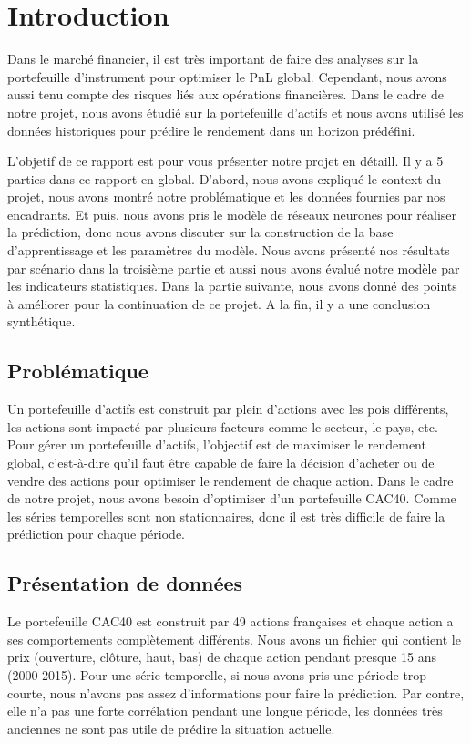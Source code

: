 
\section{Introduction}

Dans le marché financier, il est très important de faire des analyses sur la portefeuille d'instrument pour optimiser le PnL global. Cependant, nous avons aussi tenu compte des risques liés aux opérations financières. Dans le cadre de notre projet, nous avons étudié sur la portefeuille d'actifs et nous avons utilisé les données historiques pour prédire le rendement dans un horizon prédéfini.

L’objetif de ce rapport est pour vous présenter notre projet en détaill. Il y a 5 parties dans ce rapport en global. D’abord, nous avons expliqué le context du projet, nous avons montré notre problématique et les données fournies par nos encadrants. Et puis, nous avons pris le modèle de réseaux neurones pour réaliser la prédiction, donc nous avons discuter sur la construction de la base d’apprentissage et les paramètres du modèle. Nous avons présenté nos résultats par scénario dans la troisième partie et aussi nous avons évalué notre modèle par les indicateurs statistiques. Dans la partie suivante, nous avons donné des points à améliorer pour la continuation de ce projet. A la fin, il y a une conclusion synthétique. 


\subsection{Problématique}

Un portefeuille d'actifs est construit par plein d'actions avec les pois différents, les actions sont impacté par plusieurs facteurs comme le secteur, le pays, etc. Pour gérer un portefeuille d'actifs, l'objectif est de maximiser le rendement global, c'est-à-dire qu'il faut être capable de faire la décision d'acheter ou de vendre des actions pour optimiser le rendement de chaque action. Dans le cadre de notre projet, nous avons besoin d’optimiser d'un portefeuille CAC40. Comme les séries temporelles sont non stationnaires, donc il est très difficile de faire la prédiction pour chaque période.

\subsection{Présentation de données}

Le portefeuille CAC40 est construit par 49 actions françaises et chaque action a ses comportements complètement différents. Nous avons un fichier qui contient le prix (ouverture, clôture, haut, bas) de chaque action pendant presque 15 ans (2000-2015). Pour une série temporelle, si nous avons pris une période trop courte, nous n'avons pas assez d'informations pour faire la prédiction. Par contre, elle n'a pas une forte corrélation pendant une longue période, les données très anciennes ne sont pas utile de prédire la situation actuelle.

